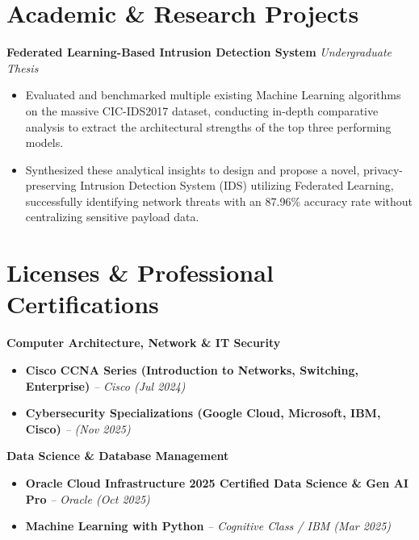 \documentclass[a4paper,11pt]{article}
\begin{document}
\section*{Academic \& Research Projects}
\noindent
\textbf{Federated Learning-Based Intrusion Detection System} \hfill \textit{Undergraduate Thesis}
\begin{itemize}[leftmargin=1.5em, itemsep=0.25em]
    \item \justifying Evaluated and benchmarked multiple existing Machine Learning algorithms on the massive CIC-IDS2017 dataset, conducting in-depth comparative analysis to extract the architectural strengths of the top three performing models.
    \item \justifying Synthesized these analytical insights to design and propose a novel, privacy-preserving Intrusion Detection System (IDS) utilizing Federated Learning, successfully identifying network threats with an 87.96\% accuracy rate without centralizing sensitive payload data.
\end{itemize}

\vspace{0.4em}
\section*{Licenses \& Professional Certifications}

\noindent \textbf{\faNetworkWired \hspace{0.2em} Computer Architecture, Network \& IT Security}
\begin{itemize}[leftmargin=1.5em, itemsep=0.2em]
    \item \textbf{Cisco CCNA Series (Introduction to Networks, Switching, Enterprise)} \textit{-- Cisco (Jul 2024)}
    \item \textbf{Cybersecurity Specializations (Google Cloud, Microsoft, IBM, Cisco)} \textit{-- (Nov 2025)}
\end{itemize}

\vspace{0.2em}

\noindent \textbf{\faBrain \hspace{0.2em} Data Science \& Database Management}
\begin{itemize}[leftmargin=1.5em, itemsep=0.2em]
    \item \textbf{Oracle Cloud Infrastructure 2025 Certified Data Science \& Gen AI Pro} \textit{-- Oracle (Oct 2025)}
    \item \textbf{Machine Learning with Python} \textit{-- Cognitive Class / IBM (Mar 2025)}
\end{itemize}
\end{document}
